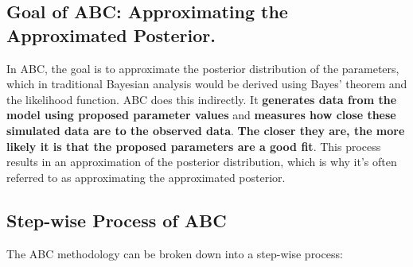 \documentclass{article}
\begin{document}
\subsection{Goal of ABC:  Approximating the Approximated Posterior.}
In ABC, the goal is to approximate the posterior distribution of the parameters, which in traditional Bayesian analysis would be derived using Bayes' theorem and the likelihood function. ABC does this indirectly. It \textbf{generates data from the model using proposed parameter values} and \textbf{measures how close these simulated data are to the observed data}. \textbf{The closer they are, the more likely it is that the proposed parameters are a good fit}. This process results in an approximation of the posterior distribution, which is why it's often referred to as approximating the approximated posterior.

\subsection{Step-wise Process of ABC}

The ABC methodology can be broken down into a step-wise process:
\end{document}
